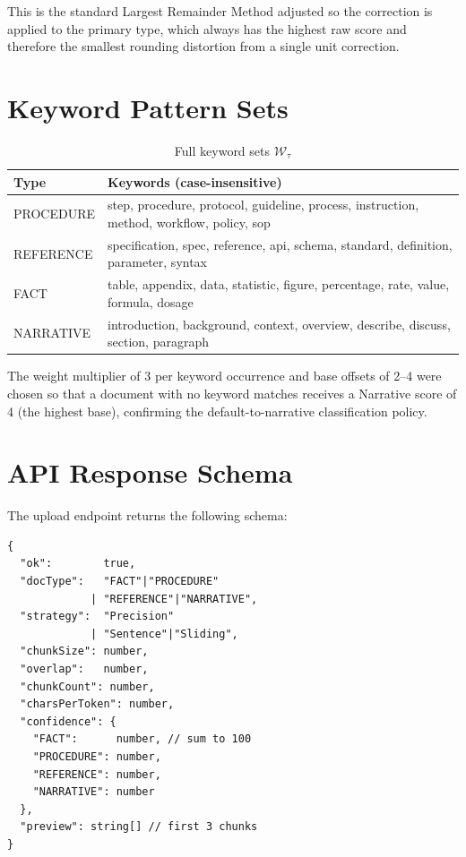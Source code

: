 \documentclass[conference]{IEEEtran}
\begin{document}
This is the standard Largest Remainder Method adjusted
so the correction is applied to the primary type, which
always has the highest raw score and therefore the smallest
rounding distortion from a single unit correction.

\section{Keyword Pattern Sets}
\label{app:patterns}

\begin{table}[h]
\centering
\caption{Full keyword sets $\mathcal{W}_\tau$}
\label{tab:keywords}
\begin{tabular}{lp{5cm}}
\toprule
Type & Keywords (case-insensitive) \\
\midrule
PROCEDURE &
  step, procedure, protocol, guideline, process,
  instruction, method, workflow, policy, sop \\
REFERENCE &
  specification, spec, reference, api, schema,
  standard, definition, parameter, syntax \\
FACT &
  table, appendix, data, statistic, figure,
  percentage, rate, value, formula, dosage \\
NARRATIVE &
  introduction, background, context, overview,
  describe, discuss, section, paragraph \\
\bottomrule
\end{tabular}
\end{table}

The weight multiplier of 3 per keyword occurrence and base
offsets of 2--4 were chosen so that a document with no
keyword matches receives a Narrative score of 4 (the
highest base), confirming the default-to-narrative
classification policy.

\section{API Response Schema}
\label{app:api}

The upload endpoint returns the following schema:

\begin{verbatim}
{
  "ok":        true,
  "docType":   "FACT"|"PROCEDURE"
             | "REFERENCE"|"NARRATIVE",
  "strategy":  "Precision"
             | "Sentence"|"Sliding",
  "chunkSize": number,
  "overlap":   number,
  "chunkCount": number,
  "charsPerToken": number,
  "confidence": {
    "FACT":      number, // sum to 100
    "PROCEDURE": number,
    "REFERENCE": number,
    "NARRATIVE": number
  },
  "preview": string[] // first 3 chunks
}
\end{verbatim}
\end{document}
